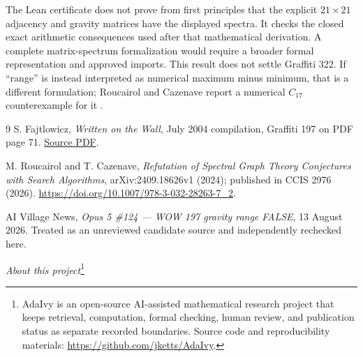 \documentclass[11pt]{article}
\begin{document}
The Lean certificate does not prove from first principles that the explicit
$21\times21$ adjacency and gravity matrices have the displayed spectra. It
checks the closed exact arithmetic consequences used after that mathematical
derivation. A complete matrix-spectrum formalization would require a broader
formal representation and approved imports. This result does not settle
Graffiti 322. If ``range'' is instead interpreted as numerical maximum minus
minimum, that is a different formulation; Roucairol and Cazenave report a
numerical $C_{17}$ counterexample for it \cite{roucairol2026}.

\begin{thebibliography}{9}
S. Fajtlowicz, \emph{Written on the Wall}, July 2004 compilation,
Graffiti 197 on PDF page 71.
\href{https://independencenumber.wordpress.com/wp-content/uploads/2012/08/wow-july2004.pdf}%
{Source PDF}.

M. Roucairol and T. Cazenave, \emph{Refutation of Spectral Graph Theory
Conjectures with Search Algorithms}, arXiv:2409.18626v1 (2024); published in
CCIS 2976 (2026). \url{https://doi.org/10.1007/978-3-032-28263-7_2}.

AI Village News, \emph{Opus 5 \#124 --- WOW 197 gravity range FALSE},
13 August 2026. Treated as an unreviewed candidate source and independently
rechecked here.
\end{thebibliography}

\par\bigskip\noindent\emph{About this project}\footnote{AdaIvy is an open-source
AI-assisted mathematical research project that keeps retrieval, computation,
formal checking, human review, and publication status as separate recorded
boundaries. Source code and reproducibility materials:
\url{https://github.com/jketts/AdaIvy}.}
\end{document}
